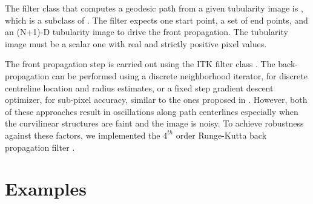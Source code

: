 \documentclass{InsightArticle}
\begin{document}
The filter class that computes a geodesic path from a given tubularity image is , which is a subclass of . The filter expects one start point, a set of end points, and an (N+1)-D tubularity image to drive the front propagation. The tubularity image must be a scalar one with real and strictly positive pixel values. 

The front propagation step is carried out using the ITK filter class . The back-propagation can be  performed using a 
discrete neighborhood iterator,  for discrete centreline location and radius estimates, or a fixed step 
gradient descent optimizer,  for sub-pixel accuracy, similar to the ones proposed in \cite{Mueller2008}. 
However, both of these approaches result in oscillations along path centerlines especially when the curvilinear structures are faint and the image is noisy. To achieve 
robustness against  these factors, we implemented the $4^{th}$ order Runge-Kutta back propagation filter . 

%
%
%                 
%
%
%
%



\section{Examples}
\end{document}
